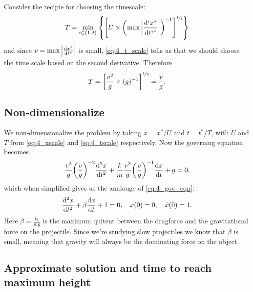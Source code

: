 \documentclass[11pt,letter, swedish, english
]{article}
\begin{document}
Consider the recipie for choosing the timescale:
\begin{equation}\label{eq:4_t_scale}
T=\min_{i\in\{1, 2\}}\qty{\qty[
U\times\qty(\max\abs{\frac{\dd^i x^*}{\dd{t^*}^i}})^{-1}
]^{\nicefrac{1}{i}}}
\end{equation}
and since $v=\max\abs{\dv{x^*}{t^*}}$ is small, \eqref{eq:4_t_scale}
tells us that we should choose the time scale based on the second
derivative. Therefore
\begin{equation}\label{eq:4_tscale}
T=\qty[\frac{v^2}{g}\times(g)^{-1}]^{\nicefrac{1}{2}} = \frac{v}{g}.
\end{equation}

\subsection{Non-dimensionalize}
We non-dimensionalize the problem by taking $x=x^*/U$ and $t=t^*/T$,
with $U$ and $T$ from \eqref{eq:4_xscale} and \eqref{eq:4_tscale}
respectively. Now the governing equation becomes
\begin{equation}
\frac{v^2}{g}\qty(\frac{v}{g})^{-2}\dv[2]{x}{t} 
+ \frac{k}{m} \frac{v^2}{g}\qty(\frac{v}{g})^{-1}\dv{x}{t}
+ g = 0,
\end{equation}
which when simplified gives us the analouge of \eqref{eq:4_gov_eqn}:
\begin{equation}
\dv[2]{x}{t} + \beta\dv{x}{t} + 1 = 0\qcomma
x(0)=0\qcomma \dot{x}(0)=1.
\end{equation}
Here $\beta=\frac{kv}{mg}$ is the maximum quitent between the
dragforce and the gravitational force on the projectile. Since we're
studying slow projectiles we know that $\beta$ is small, meaning that
gravity will always be the dominating force on the object. 

\subsection{Approximate solution and time to reach maximum height}
\end{document}
